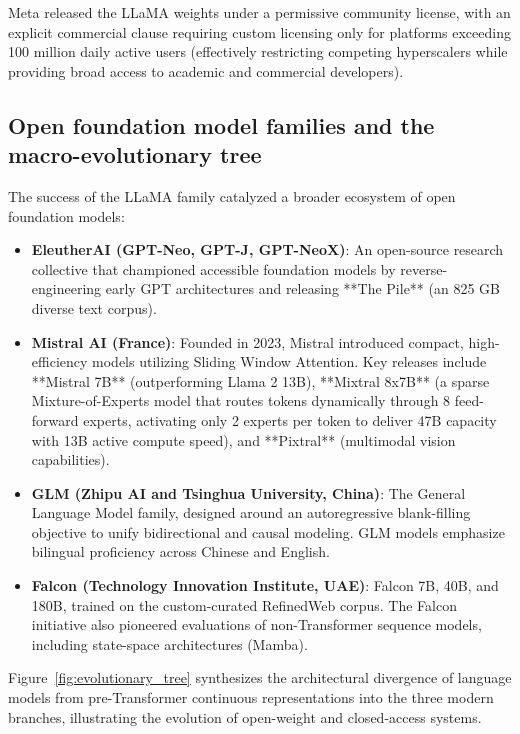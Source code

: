 \documentclass[../../main.tex]{subfiles}
\begin{document}
Meta released the LLaMA weights under a permissive community license, with an explicit commercial clause requiring custom licensing only for platforms exceeding 100 million daily active users (effectively restricting competing hyperscalers while providing broad access to academic and commercial developers).


\subsection{Open foundation model families and the macro-evolutionary tree}
\label{subsec:open_model_families}

The success of the LLaMA family catalyzed a broader ecosystem of open foundation models:
\begin{itemize}
    \item \textbf{EleutherAI (GPT-Neo, GPT-J, GPT-NeoX)}: An open-source research collective that championed accessible foundation models by reverse-engineering early GPT architectures and releasing **The Pile** (an 825 GB diverse text corpus).
    
    \item \textbf{Mistral AI (France)}: Founded in 2023, Mistral introduced compact, high-efficiency models utilizing Sliding Window Attention. Key releases include **Mistral 7B** (outperforming Llama 2 13B), **Mixtral 8x7B** (a sparse Mixture-of-Experts model that routes tokens dynamically through 8 feed-forward experts, activating only 2 experts per token to deliver 47B capacity with 13B active compute speed), and **Pixtral** (multimodal vision capabilities).
    
    \item \textbf{GLM (Zhipu AI and Tsinghua University, China)}: The General Language Model family, designed around an autoregressive blank-filling objective to unify bidirectional and causal modeling. GLM models emphasize bilingual proficiency across Chinese and English.
    
    \item \textbf{Falcon (Technology Innovation Institute, UAE)}: Falcon 7B, 40B, and 180B, trained on the custom-curated RefinedWeb corpus. The Falcon initiative also pioneered evaluations of non-Transformer sequence models, including state-space architectures (Mamba).
\end{itemize}

Figure~\ref{fig:evolutionary_tree} synthesizes the architectural divergence of language models from pre-Transformer continuous representations into the three modern branches, illustrating the evolution of open-weight and closed-access systems.
\end{document}
